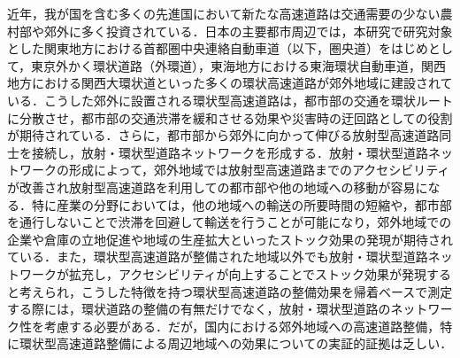 近年，我が国を含む多くの先進国において新たな高速道路は交通需要の少ない農村部や郊外に多く投資されている．日本の主要都市周辺では，本研究で研究対象とした関東地方における首都圏中央連絡自動車道（以下，圏央道）をはじめとして，東京外かく環状道路（外環道），東海地方における東海環状自動車道，関西地方における関西大環状道といった多くの環状高速道路が郊外地域に建設されている．こうした郊外に設置される環状型高速道路は，都市部の交通を環状ルートに分散させ，都市部の交通渋滞を緩和させる効果や災害時の迂回路としての役割が期待されている．さらに，都市部から郊外に向かって伸びる放射型高速道路同士を接続し，放射・環状型道路ネットワークを形成する．放射・環状型道路ネットワークの形成によって，郊外地域では放射型高速道路までのアクセシビリティが改善され放射型高速道路を利用しての都市部や他の地域への移動が容易になる．特に産業の分野においては，他の地域への輸送の所要時間の短縮や，都市部を通行しないことで渋滞を回避して輸送を行うことが可能になり，郊外地域での企業や倉庫の立地促進や地域の生産拡大といったストック効果の発現が期待されている．また，環状型高速道路が整備された地域以外でも放射・環状型道路ネットワークが拡充し，アクセシビリティが向上することでストック効果が発現すると考えられ，こうした特徴を持つ環状型高速道路の整備効果を帰着ベースで測定する際には，環状道路の整備の有無だけでなく，放射・環状型道路のネットワーク性を考慮する必要がある．だが，国内における郊外地域への高速道路整備，特に環状型高速道路整備による周辺地域への効果についての実証的証拠は乏しい．
